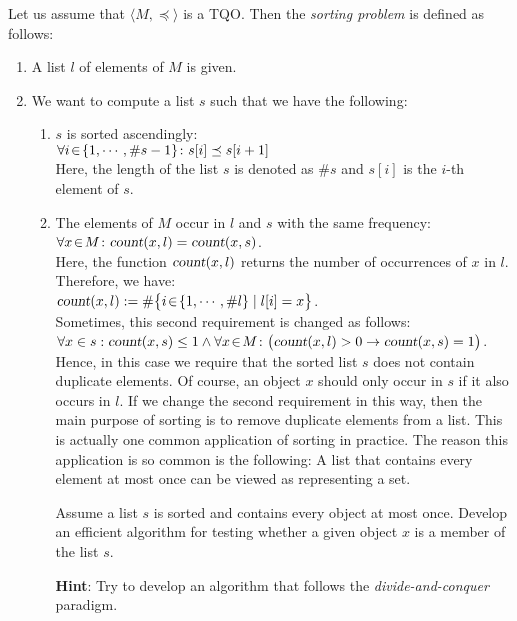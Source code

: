 Let us assume that $\langle M, \preceq \rangle$ is a  \textsc{TQO}.  Then the \emph{sorting problem}
is defined as follows:
\begin{enumerate}
\item A list $l$ of elements of $M$ is given.
\item We want to compute a list $s$ such that we have the following: 
  \begin{enumerate}
  \item $s$ is sorted ascendingly: \\[0.2cm]
        \hspace*{1.3cm} 
        $\forall i \!\in\! \{ 1, \cdots, \#s-1 \} \colon s[i] \preceq s[i+1]$ 
        \\[0.2cm]
        Here, the length of the list $s$ is denoted as $\#s$ and $s[i]$ is the $i$-th element of $s$.
  \item The elements of $M$ occur in $l$ and $s$ with the same frequency: \\[0.2cm]
        \hspace*{1.3cm} 
        $\forall x\!\in\! M \colon \textsl{count}(x,l) = \textsl{count}(x,s)$.
        \\[0.2cm]
        Here, the function $\textsl{count}(x,l)$ returns the number of occurrences of $x$ in $l$.
        Therefore, we have: \\[0.2cm]
        \hspace*{1.3cm}
        $\textsl{count}(x,l) := \# \bigl\{ i \!\in\! \{1,\cdots,\#l\} \mid l[i] = x \bigr\}$.
        \\[0.2cm]
        Sometimes, this second requirement is changed as follows:
        \\[0.2cm]
        \hspace*{1.3cm}
        $\forall x \in s: \textsl{count}(x,s) \leq 1 \wedge \forall x\!\in\! M \colon \bigl(\textsl{count}(x,l) > 0 \rightarrow \textsl{count}(x,s) = 1\bigr)$.
        \\[0.2cm]
        Hence, in this case we require that the sorted list $s$ does not contain duplicate elements.
        Of course, an object $x$ should only occur in $s$ if it also occurs in $l$.  If we change
        the second requirement in this way, then the main purpose of sorting is to remove duplicate
        elements from a list.  This is actually one common application of sorting in practice.  The
        reason this application is so common is the following: A list that contains every element at
        most once can be viewed as representing a set.

        \exercise
        Assume a list $s$ is sorted and contains every object at most once.  Develop an efficient
        algorithm for testing whether a given object $x$ is a member of the list $s$.

        \textbf{Hint}: Try to develop an algorithm that follows the \emph{divide-and-conquer}
        paradigm. 
  \end{enumerate}
\end{enumerate}
